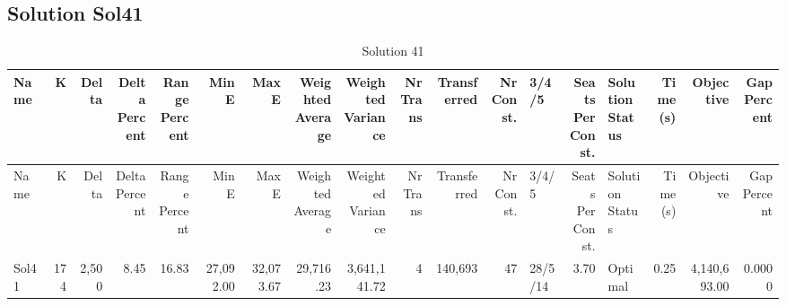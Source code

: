 \documentclass[a4paper]{article}
\begin{document}
\clearpage
\subsection{Solution Sol41}

{\scriptsize
\begin{longtable}{lrrrrrrrrrrrlrlrrr}
\caption{Solution 41}
\\ \toprule
Name &K &Delta &\shortstack{Delta\\Percent} &\shortstack{Range\\Percent} &Min E &Max E &\shortstack{Weighted\\Average} &\shortstack{Weighted\\Variance} &\shortstack{Nr\\Trans} &Transferred &\shortstack{Nr\\Const.} &3/4/5 &\shortstack{Seats\\Per\\Const.} &\shortstack{Solution\\Status} &\shortstack{Time\\(s)} &Objective &\shortstack{Gap\\Percent} \\ \midrule
\endfirsthead
\toprule
Name &K &Delta &\shortstack{Delta\\Percent} &\shortstack{Range\\Percent} &Min E &Max E &\shortstack{Weighted\\Average} &\shortstack{Weighted\\Variance} &\shortstack{Nr\\Trans} &Transferred &\shortstack{Nr\\Const.} &3/4/5 &\shortstack{Seats\\Per\\Const.} &\shortstack{Solution\\Status} &\shortstack{Time\\(s)} &Objective &\shortstack{Gap\\Percent} \\ \midrule
\endhead
\bottomrule
\endfoot
Sol41&174&2,500& 8.45&16.83&27,092.00&32,073.67&29,716.23&3,641,141.72&4&140,693&47&28/5/14& 3.70&Optimal& 0.25&4,140,693.00&0.0000\\ 
\end{longtable}

}
\end{document}
